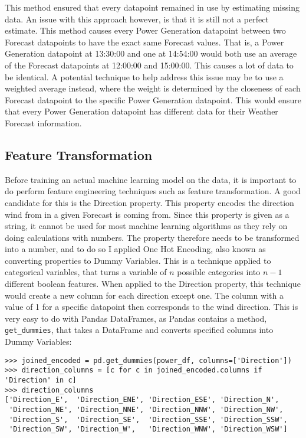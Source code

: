 This method ensured that every datapoint remained in use by estimating missing data. An issue with this approach however, is that it is still not a perfect estimate. This method causes every Power Generation datapoint between two Forecast datapoints to have the exact same Forecast values. That is, a Power Generation datapoint at 13:30:00 and one at 14:54:00 would both use an average of the Forecast datapoints at 12:00:00 and 15:00:00. This causes a lot of data to be identical. A potential technique to help address this issue may be to use a weighted average instead, where the weight is determined by the closeness of each Forecast datapoint to the specific Power Generation datapoint. This would ensure that every Power Generation datapoint has different data for their Weather Forecast information.

\subsection{Feature Transformation}

Before training an actual machine learning model on the data, it is important to do perform feature engineering techniques such as feature transformation. A good candidate for this is the Direction property. This property encodes the direction wind from in a given Forecast is coming from. Since this property is given as a string, it cannot be used for most machine learning algorithms as they rely on doing calculations with numbers. The property therefore needs to be transformed into a number, and to do so I applied One Hot Encoding, also known as converting properties to Dummy Variables. This is a technique applied to categorical variables, that turns a variable of $n$ possible categories into $n-1$ different boolean features. When applied to the Direction property, this technique would create a new column for each direction except one. The column with a value of 1 for a specific datapoint then corresponds to the wind direction. This is very easy to do with Pandas DataFrames, as Pandas contains a method, \texttt{get\_dummies}, that takes a DataFrame and converts specified columns into Dummy Variables:

\begin{verbatim}
>>> joined_encoded = pd.get_dummies(power_df, columns=['Direction'])
>>> direction_columns = [c for c in joined_encoded.columns if 'Direction' in c]
>>> direction_columns
['Direction_E',  'Direction_ENE', 'Direction_ESE', 'Direction_N',
 'Direction_NE', 'Direction_NNE', 'Direction_NNW', 'Direction_NW',
 'Direction_S',  'Direction_SE',  'Direction_SSE', 'Direction_SSW',
 'Direction_SW', 'Direction_W',   'Direction_WNW', 'Direction_WSW']
\end{verbatim}

